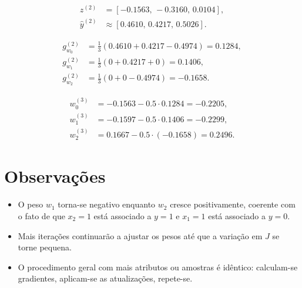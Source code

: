 \documentclass[12pt]{article}
\begin{document}
\[
\begin{aligned}
z^{(2)} &= [-0.1563,\,-0.3160,\,0.0104],\\
\hat{y}^{(2)} &\approx [0.4610,\,0.4217,\,0.5026].
\end{aligned}
\]

\[
\begin{aligned}
g_{w_0}^{(2)} &= \tfrac13(0.4610 + 0.4217 - 0.4974) = 0.1284,\\
g_{w_1}^{(2)} &= \tfrac13(0\!+\!0.4217\!+\!0) = 0.1406,\\
g_{w_2}^{(2)} &= \tfrac13(0\!+\!0\!-\!0.4974) = -0.1658.
\end{aligned}
\]

\[
\boxed{
\begin{aligned}
w_0^{(3)} &= -0.1563 - 0.5\cdot 0.1284 = -0.2205,\\
w_1^{(3)} &= -0.1597 - 0.5\cdot 0.1406 = -0.2299,\\
w_2^{(3)} &=  0.1667 - 0.5\cdot (-0.1658) = 0.2496.
\end{aligned}}
\]

\section{Observações}

\begin{itemize}
  \item O peso $w_1$ torna-se negativo enquanto $w_2$ cresce positivamente, coerente com o fato de que $x_2=1$ está associado a $y=1$ e $x_1=1$ está associado a $y=0$.
  \item Mais iterações continuarão a ajustar os pesos até que a variação em $J$ se torne pequena.
  \item O procedimento geral com mais atributos ou amostras é idêntico: calculam-se gradientes, aplicam-se as atualizações, repete-se.
\end{itemize}
\end{document}
